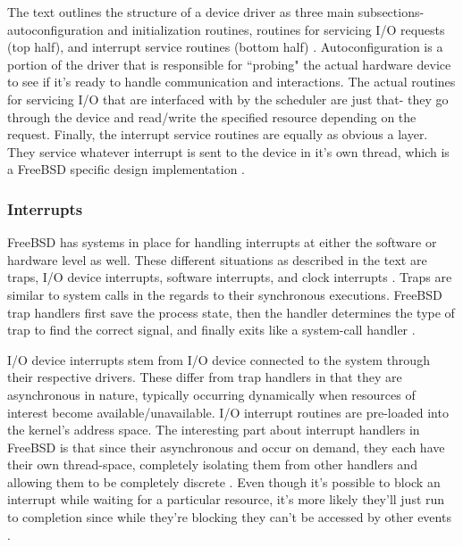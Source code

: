 \documentclass[10pt,draftclsnofoot,onecolumn]{IEEEtran}
\begin{document}
\par The text outlines the structure of a device driver as three main subsections- autoconfiguration and initialization routines, routines for servicing I/O requests (top half), and interrupt service routines (bottom half) \cite{bsd:1}.
Autoconfiguration is a portion of the driver that is responsible for ``probing" the actual hardware device to see if it's ready to handle communication and interactions.
The actual routines for servicing I/O that are interfaced with by the scheduler are just that- they go through the device and read/write the specified resource depending on the request.
Finally, the interrupt service routines are equally as obvious a layer.
They service whatever interrupt is sent to the device in it's own thread, which is a FreeBSD specific design implementation \cite{bsd:1}.\\

\subsubsection{Interrupts}
\label{sub:Interrupts FreeBSD}
\par FreeBSD has systems in place for handling interrupts at either the software or hardware level as well.
These different situations as described in the text are traps, I/O device interrupts, software interrupts, and clock interrupts \cite{bsd:1}.
Traps are similar to system calls in the regards to their synchronous executions.
FreeBSD trap handlers first save the process state, then the handler determines the type of trap to find the correct signal, and finally exits like a system-call handler \cite{bsd:1}.

\par I/O device interrupts stem from I/O device connected to the system through their respective drivers.
These differ from trap handlers in that they are asynchronous in nature, typically occurring dynamically when resources of interest become available/unavailable.
I/O interrupt routines are pre-loaded into the kernel's address space.
The interesting part about interrupt handlers in FreeBSD is that since their asynchronous and occur on demand, they each have their own thread-space, completely isolating them from other handlers and allowing them to be completely discrete \cite{bsd:1}.
Even though it's possible to block an interrupt while waiting for a particular resource, it's more likely they'll just run to completion since while they're blocking they can't be accessed by other events \cite{bsd:1}.
\end{document}
